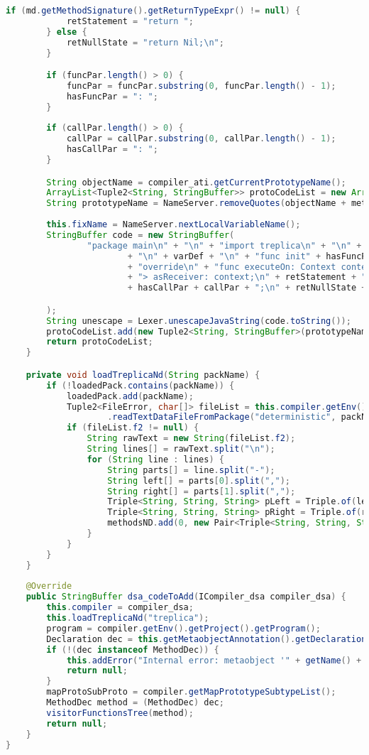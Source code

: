\begin{lstlisting}[basicstyle=\tiny, language=Java, caption={Código Fonte de \textbf{CyanMetaobjectTreplicaAction}}, label={cod:MetaActionFonte}]
		if (md.getMethodSignature().getReturnTypeExpr() != null) {
			retStatement = "return ";
		} else {
			retNullState = "return Nil;\n";
		}

		if (funcPar.length() > 0) {
			funcPar = funcPar.substring(0, funcPar.length() - 1);
			hasFuncPar = ": ";
		}
        
		if (callPar.length() > 0) {
			callPar = callPar.substring(0, callPar.length() - 1);
			hasCallPar = ": ";
		}

		String objectName = compiler_ati.getCurrentPrototypeName();
		ArrayList<Tuple2<String, StringBuffer>> protoCodeList = new ArrayList<>();
		String prototypeName = NameServer.removeQuotes(objectName + methodName);
        
        this.fixName = NameServer.nextLocalVariableName();
		StringBuffer code = new StringBuffer(
				"package main\n" + "\n" + "import treplica\n" + "\n" + "object " + prototypeName + " extends Action\n"
						+ "\n" + varDef + "\n" + "func init" + hasFuncPar + funcPar + " {\n" + funcAssign + "}\n" + "\n"
						+ "override\n" + "func executeOn: Context context -> Dyn {\n" + "var obj = Cast<" + objectName
						+ "> asReceiver: context;\n" + retStatement + "obj " + methodName + "TreplicaAction" + this.fixName
                        + hasCallPar + callPar + ";\n" + retNullState + "}\n" + "end\n"

		);
		String unescape = Lexer.unescapeJavaString(code.toString());
		protoCodeList.add(new Tuple2<String, StringBuffer>(prototypeName, new StringBuffer(unescape)));
		return protoCodeList;
	}

	private void loadTreplicaNd(String packName) {
		if (!loadedPack.contains(packName)) {
   			loadedPack.add(packName);
   			Tuple2<FileError, char[]> fileList = this.compiler.getEnv().getProject().getCompilerManager()
   					.readTextDataFileFromPackage("deterministic", packName);
   			if (fileList.f2 != null) {
   				String rawText = new String(fileList.f2);
   				String lines[] = rawText.split("\n");
   				for (String line : lines) {
   					String parts[] = line.split("-");
   					String left[] = parts[0].split(",");
   					String right[] = parts[1].split(",");
   					Triple<String, String, String> pLeft = Triple.of(left[0], left[1], left[2]);
   					Triple<String, String, String> pRight = Triple.of(right[0], right[1], right[2]);
   					methodsND.add(0, new Pair<Triple<String, String, String>, Triple<String, String, String>>(pLeft, pRight));
   				}
   			}
   		}
	}
	
	@Override
	public StringBuffer dsa_codeToAdd(ICompiler_dsa compiler_dsa) {
		this.compiler = compiler_dsa;
		this.loadTreplicaNd("treplica");
		program = compiler.getEnv().getProject().getProgram();
		Declaration dec = this.getMetaobjectAnnotation().getDeclaration();
		if (!(dec instanceof MethodDec)) {
			this.addError("Internal error: metaobject '" + getName() + "' should be attached to a method");
			return null;
		}
		mapProtoSubProto = compiler.getMapPrototypeSubtypeList();
		MethodDec method = (MethodDec) dec;
		visitorFunctionsTree(method);
		return null;
	}
}
\end{lstlisting}

